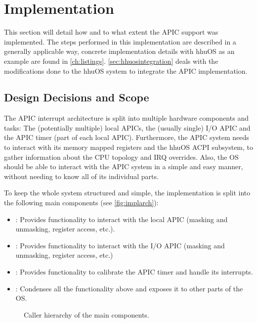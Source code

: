 \chapter{Implementation}
\label{ch:implementation}

This section will detail how and to what extent the APIC support was implemented. The steps
performed in this implementation are described in a generally applicable way, concrete
implementation details with hhuOS as an example are found in \autoref{ch:listings}.
\autoref{sec:hhuosintegration} deals with the modifications done to the hhuOS system to integrate
the APIC implementation.

\clearpage

\section{Design Decisions and Scope}
\label{sec:design}

The APIC interrupt architecture is split into multiple hardware components and tasks: The
(potentially multiple) local APICs, the (usually single) I/O APIC and the APIC timer (part of each
local APIC). Furthermore, the APIC system needs to interact with its memory mapped registers and
the hhuOS ACPI subsystem, to gather information about the CPU topology and IRQ overrides. Also, the
OS should be able to interact with the APIC system in a simple and easy manner, without needing to
know all of its individual parts.

To keep the whole system structured and simple, the implementation is split into the following main
components (see \autoref{fig:implarch}):

\begin{itemize}
  \item {}: Provides functionality to interact with the local APIC
        (masking and unmasking, register access, etc.).
  \item {}: Provides functionality to interact with the I/O APIC (masking and
        unmasking, register access, etc.)
  \item {}: Provides functionality to calibrate the APIC timer and handle its interrupts.
  \item {}: Condenses all the functionality above and exposes it to other parts
        of the OS\@.
\end{itemize}

\begin{figure}[h]
  \centering
  \begin{subfigure}[b]{0.5\textwidth}
    
  \end{subfigure}
  \caption{Caller hierarchy of the main components.}
  \label{fig:implarch}
\end{figure}

